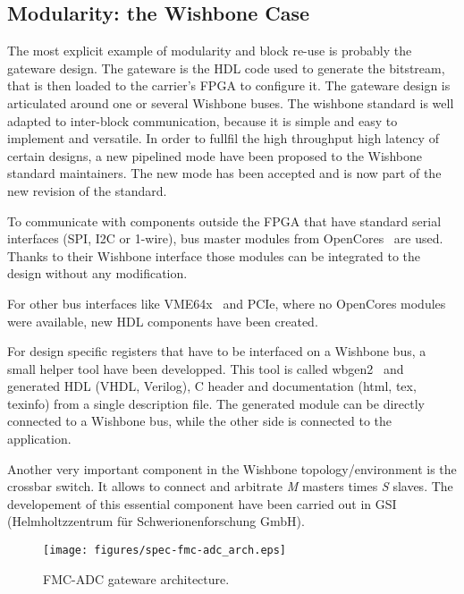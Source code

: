 \documentclass{JAC2003}
\begin{document}
\subsection{Modularity: the Wishbone Case}
The most explicit example of modularity and block re-use is probably the gateware design.
The gateware is the HDL code used to generate the bitstream, that is then loaded to the carrier's FPGA to configure it.
The gateware design is articulated around one or several Wishbone buses.
The wishbone standard is well adapted to inter-block communication, because it is simple and easy to implement and versatile.
In order to fullfil the high throughput high latency of certain designs, a new pipelined mode have been proposed to the Wishbone standard maintainers. The new mode has been accepted and is now part of the new revision of the standard.

To communicate with components outside the FPGA that have standard serial interfaces (SPI, I2C or 1-wire), bus master modules from OpenCores~\cite{opencores} are used.
Thanks to their Wishbone interface those modules can be integrated to the design without any modification.

For other bus interfaces like VME64x~\cite{vme} and PCIe, where no OpenCores modules were available, new HDL components have been created.

For design specific registers that have to be interfaced on a Wishbone bus, a small helper tool have been developped.
This tool is called wbgen2~\cite{wbgen2} and generated HDL (VHDL, Verilog), C header and documentation (html, tex, texinfo) from a single description file.
The generated module can be directly connected to a Wishbone bus, while the other side is connected to the application.

Another very important component in the Wishbone topology/environment is the crossbar switch. It allows to connect and arbitrate \textit{M} masters times \textit{S} slaves.
The developement of this essential component have been carried out in GSI (Helmholtzzentrum f\"ur Schwerionenforschung GmbH).

\begin{figure}[htb]
   \centering
   \texttt{[image: figures/spec-fmc-adc\_arch.eps]}
   \caption{FMC-ADC gateware architecture.}
   \label{spec-fmc-adc_arch}
\end{figure}
\end{document}
